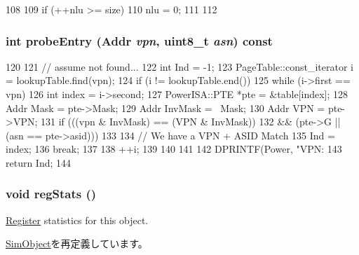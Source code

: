 \begin{DoxyCode}
108     {
109         if (++nlu >= size) {
110             nlu = 0;
111         }
112     }
\end{DoxyCode}
\hypertarget{classPowerISA_1_1TLB_a4dd1511c095e58173f0f7b78eeded1fe}{
\subsubsection[{probeEntry}]{\setlength{\rightskip}{0pt plus 5cm}int probeEntry ({\bf Addr} {\em vpn}, \/  uint8\_\-t {\em asn}) const}}
\label{classPowerISA_1_1TLB_a4dd1511c095e58173f0f7b78eeded1fe}



\begin{DoxyCode}
120 {
121     // assume not found...
122     int Ind = -1;
123     PageTable::const_iterator i = lookupTable.find(vpn);
124     if (i != lookupTable.end()) {
125         while (i->first == vpn) {
126             int index = i->second;
127             PowerISA::PTE *pte = &table[index];
128             Addr Mask = pte->Mask;
129             Addr InvMask = ~Mask;
130             Addr VPN  = pte->VPN;
131             if (((vpn & InvMask) == (VPN & InvMask))
132                 && (pte->G  || (asn == pte->asid))) {
133 
134                 // We have a VPN + ASID Match
135                 Ind = index;
136                 break;
137             }
138             ++i;
139         }
140     }
141 
142     DPRINTF(Power, "VPN: %
143     return Ind;
144 }
\end{DoxyCode}
\hypertarget{classPowerISA_1_1TLB_a4dc637449366fcdfc4e764cdf12d9b11}{
\subsubsection[{regStats}]{\setlength{\rightskip}{0pt plus 5cm}void regStats ()}}
\label{classPowerISA_1_1TLB_a4dc637449366fcdfc4e764cdf12d9b11}
\hyperlink{classRegister}{Register} statistics for this object. 

\hyperlink{classSimObject_a4dc637449366fcdfc4e764cdf12d9b11}{SimObject}を再定義しています。


